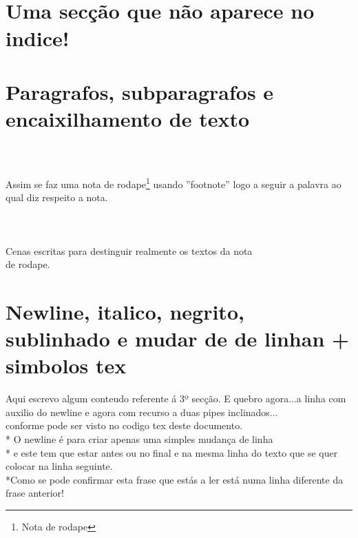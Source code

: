 \documentclass[a4paper,11pt]{report}%
\begin{document}
\paragraph{\ \ \ }%
\section*{Uma secção que não aparece no indice!}

\newpage
\section{Paragrafos, subparagrafos e encaixilhamento de texto}
\paragraph {}
\subparagraph{}
\paragraph{\ }

\newpage
Assim se faz uma nota de rodape\footnote {Nota de rodape} usando ''footnote'' logo a seguir a palavra ao qual diz respeito a nota.
\paragraph{\ }
Cenas escritas para destinguir realmente os textos da nota \\ de rodape.


\newpage

\section {Newline, italico, negrito, sublinhado e mudar de de linhan + simbolos tex}
Aqui escrevo algum conteudo referente á 3º secção. E quebro agora...\newline a linha com auxilio do newline e agora com recurso a duas pipes inclinados... \\conforme pode ser visto no codigo tex deste documento. \\*
O newline é para criar apenas uma simples mudança de linha \\* e este tem que estar antes ou no final e na mesma linha do texto que se quer colocar na linha seguinte. \\*Como se pode confirmar esta frase que estás a ler está numa linha diferente da frase anterior!
\end{document}
